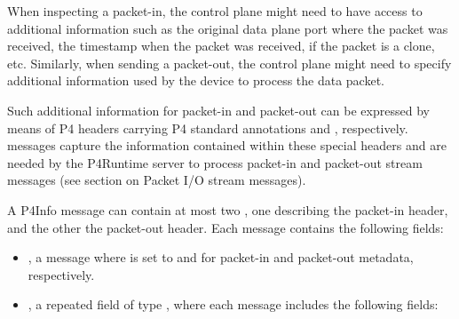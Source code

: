 \documentclass[11pt]{article}
\begin{document}
{%
When inspecting a packet-in, the control plane might need to have access to
additional information such as the original data plane port where the packet was
received, the timestamp when the packet was received, if the packet is a clone,
etc. Similarly, when sending a packet-out, the control plane might need to
specify additional information used by the device to process the data packet.%

Such additional information for packet-in and packet-out can be expressed by
means of P4 headers carrying P4 standard annotations
 and ,
respectively.  messages capture the information
contained within these special headers and are needed by the P4Runtime server to
process packet-in and packet-out stream messages (see section on Packet I/O
stream messages).%

A P4Info message can contain at most two ,
one describing the packet-in header, and the other the packet-out header. Each
message contains the following fields:%

\begin{itemize}%

\item{}
, a  message where  is set to 
and  for packet-in and packet-out metadata, respectively.%

\item{}
, a repeated field of type , where each  message
includes the following fields:%


\end{itemize}}
\end{document}
